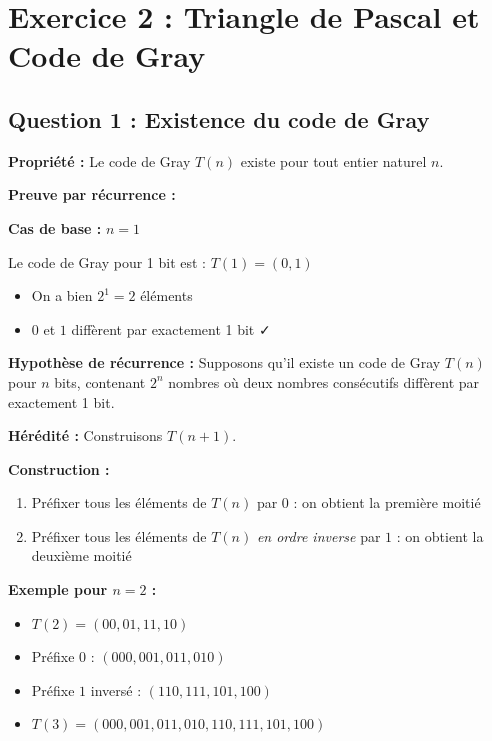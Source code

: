 \documentclass[12pt,a4paper]{article}
\begin{document}
\newpage
\section{Exercice 2 : Triangle de Pascal et Code de Gray}

\subsection{Question 1 : Existence du code de Gray}

\begin{demonstration}
\textbf{Propriété :} Le code de Gray $T(n)$ existe pour tout entier naturel $n$.

\textbf{Preuve par récurrence :}

\textbf{Cas de base :} $n = 1$

Le code de Gray pour 1 bit est : $T(1) = (0, 1)$
\begin{itemize}
    \item On a bien $2^1 = 2$ éléments
    \item $0$ et $1$ diffèrent par exactement 1 bit ✓
\end{itemize}

\textbf{Hypothèse de récurrence :} Supposons qu'il existe un code de Gray $T(n)$ pour $n$ bits, contenant $2^n$ nombres où deux nombres consécutifs diffèrent par exactement 1 bit.

\textbf{Hérédité :} Construisons $T(n+1)$.

\textbf{Construction :}
\begin{enumerate}
    \item Préfixer tous les éléments de $T(n)$ par $0$ : on obtient la première moitié
    \item Préfixer tous les éléments de $T(n)$ \textit{en ordre inverse} par $1$ : on obtient la deuxième moitié
\end{enumerate}

\textbf{Exemple pour $n=2$ :}
\begin{itemize}
    \item $T(2) = (00, 01, 11, 10)$
    \item Préfixe $0$ : $(000, 001, 011, 010)$
    \item Préfixe $1$ inversé : $(110, 111, 101, 100)$
    \item $T(3) = (000, 001, 011, 010, 110, 111, 101, 100)$
\end{itemize}


\end{demonstration}
\end{document}
